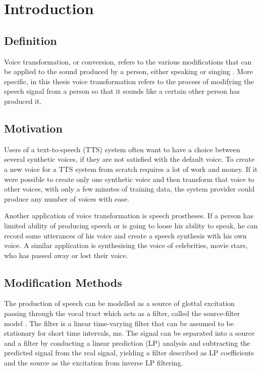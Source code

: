 \chapter{Introduction} %
\label{cha:introduction}

\section{Definition} %
\label{sec:definition}
Voice transformation, or conversion, refers to the various modifications that can be applied to the sound produced by a person, either speaking or singing \cite{stylianou08}. More specific, in this thesis voice transformation refers to the process of modifying the speech signal from a person so that it sounds like a certain other person has produced it. 

\section{Motivation} %
\label{sec:motivation}
Users of a text-to-speech (TTS) system often want to have a choice between several synthetic voices, if they are not satisfied with the default voice. To create a new voice for a TTS system from scratch requires a lot of work and money. If it were possible to create only one synthetic voice and then transform that voice to other voices, with only a few minutes of  training data, the system provider could produce any number of voices with ease. 

Another application of voice transformation is speech prostheses. If a person has limited ability of producing speech or is going to loose his ability to speak, he can record some utterances of his voice and create a speech synthesis with his own voice. A similar application is synthesising the voice of celebrities, \eg movie stars, who has passed away or lost their voice.

\section{Modification Methods} %
\label{sec:synthesis_methods}
The production of speech can be modelled as a source of glottal excitation passing through the vocal tract which acts as a filter, called the source-filter model \cite{taletek}. The filter is a linear time-varying filter that can be assumed to be stationary for short time intervals,  ms. The signal can be separated into a source and a filter by conducting a linear prediction (LP) analysis and subtracting the predicted signal from the real signal, yielding a filter described as LP coefficients and the source as the excitation from inverse LP filtering.

